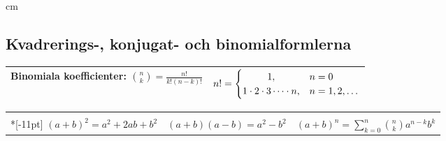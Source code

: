 \documentclass{article}
\begin{document}

\lfoot{\ifnum\thepage=1\small\today\fi}
\cfoot{}
 cm
\normalsize



\let\iff\Leftrightarrow %
\let\ob\overline        %
\newcommand\Rone{\mathbb{R}}
\def\EndRow{\\*[3pt]}


\vspace{-1.5cm} 

\subsection*{Kvadrerings-, konjugat- och binomialformlerna}%


\begin{tabular}[m]{|c|c|}
  \hline
Binomiala koefficienter:
    $\binom nk = \frac{n!}{k!(n-k)!}$
&
$n! = \begin{cases}
                \hfil1,& n=0\\
                1\cdot2\cdot3\cdots\cdot n,& n=1,2,\dots
                \end{cases}$
  \\\hline
\end{tabular}

\medskip

\begin{tabular}[m]{|c|c|c|}
      \hline
      &&\\*[-11pt]
    $(a + b)^2 = a^2 + 2ab+b^2$
    &
    $(a+b)(a-b) = a^2-b^2$
    &
    $(a+b)^n = 
    \sum_{k=0}^n\binom nk a^{n-k}b^k$\\
      \hline
\end{tabular}
% 
\end{document}
